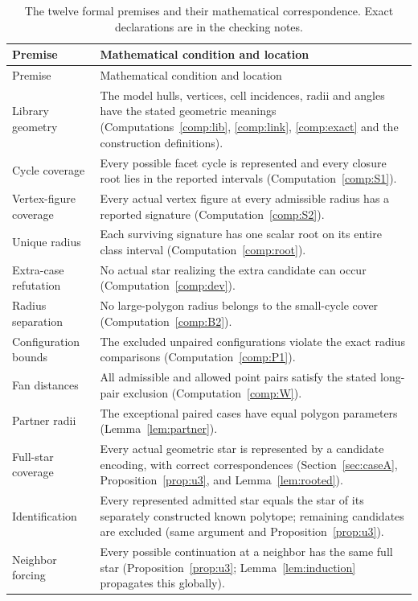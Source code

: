 \documentclass[11pt]{article}
\theoremstyle{definition}
\theoremstyle{remark}
\begin{document}
\begin{appendices}
\begin{longtable}{@{}p{}p{}@{}}
\caption{The twelve formal premises and their mathematical correspondence. Exact declarations are in the checking notes.}\label{tab:formal-inputs}\\
\toprule Premise & Mathematical condition and location\\\midrule\endfirsthead
\toprule Premise & Mathematical condition and location\\\midrule\endhead
Library geometry & The model hulls, vertices, cell incidences, radii and angles have the stated geometric meanings (Computations~\ref{comp:lib}, \ref{comp:link}, \ref{comp:exact} and the construction definitions).\\
Cycle coverage & Every possible facet cycle is represented and every closure root lies in the reported intervals (Computation~\ref{comp:S1}).\\
Vertex-figure coverage & Every actual vertex figure at every admissible radius has a reported signature (Computation~\ref{comp:S2}).\\
Unique radius & Each surviving signature has one scalar root on its entire class interval (Computation~\ref{comp:root}).\\
Extra-case refutation & No actual star realizing the extra candidate can occur (Computation~\ref{comp:dev}).\\
Radius separation & No large-polygon radius belongs to the small-cycle cover (Computation~\ref{comp:B2}).\\
Configuration bounds & The excluded unpaired configurations violate the exact radius comparisons (Computation~\ref{comp:P1}).\\
Fan distances & All admissible and allowed point pairs satisfy the stated long-pair exclusion (Computation~\ref{comp:W}).\\
Partner radii & The exceptional paired cases have equal polygon parameters (Lemma~\ref{lem:partner}).\\
Full-star coverage & Every actual geometric star is represented by a candidate encoding, with correct correspondences (Section~\ref{sec:caseA}, Proposition~\ref{prop:u3}, and Lemma~\ref{lem:rooted}).\\
Identification & Every represented admitted star equals the star of its separately constructed known polytope; remaining candidates are excluded (same argument and Proposition~\ref{prop:u3}).\\
Neighbor forcing & Every possible continuation at a neighbor has the same full star (Proposition~\ref{prop:u3}; Lemma~\ref{lem:induction} propagates this globally).\\
\bottomrule
\end{longtable}
\end{appendices}
\end{document}
